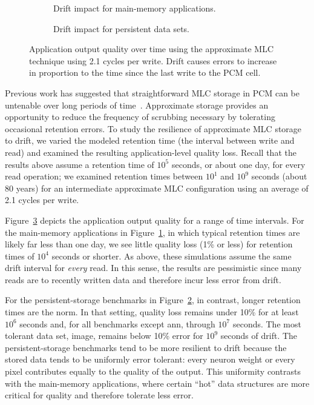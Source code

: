 \begin{figure}
    \begin{subfigure}[b]{0.5\columnwidth}
        \centering
        
        \caption{
            Drift impact for main-memory applications.
        }
        \label{approxstorage:fig:mm-drift}
    \end{subfigure}
    \begin{subfigure}[b]{0.5\columnwidth}
        \centering
        
        \caption{
            Drift impact for persistent data sets.
        }
        \label{approxstorage:fig:nv-drift}
    \end{subfigure}
    \caption{
        Application output quality over time using the approximate MLC
        technique using 2.1 cycles per write.
        Drift causes errors to increase in proportion to the time
        since the last write to the PCM cell.
    }
    \label{approxstorage:fig:drift}
\end{figure}

Previous work has suggested that straightforward MLC storage in PCM can be
untenable over long periods of time~\cite{wdddmlcpcm}.
Approximate storage provides an opportunity to reduce the frequency of
scrubbing necessary by tolerating occasional retention errors.
To study the resilience of approximate MLC storage to drift,
we varied the modeled retention time (the interval between write and read) and
examined the resulting application-level quality loss.
Recall that the results
above assume a retention time of $10^5$ seconds, or about one day, for every
read operation; we examined retention times between $10^1$ and $10^9$ seconds
(about 80 years) for an intermediate approximate MLC configuration using an
average of 2.1 cycles per write.

Figure~\ref{approxstorage:fig:drift} depicts the application output quality for a range of
time intervals.
For the main-memory applications in Figure~\ref{approxstorage:fig:mm-drift}, in which typical retention times are
likely far less than one day, we see little quality loss (1\% or
less) for retention times of $10^4$ seconds or shorter.
As above, these simulations assume the same drift interval for \emph{every}
read.
In this sense, the results are pessimistic since many reads
are to recently written data and therefore incur less error from
drift.

For the
persistent-storage benchmarks in Figure~\ref{approxstorage:fig:nv-drift}, in contrast, longer retention times are the
norm.
In that setting, quality loss remains under 10\% for at least
$10^6$ seconds and, for all benchmarks except \textsf{ann}, through $10^7$ seconds.
The most tolerant data set, \textsf{image}, remains below 10\% error for
$10^9$ seconds of drift.
The persistent-storage benchmarks tend to be more resilient to drift because
the stored data tends to be uniformly error tolerant: every neuron weight or
every pixel contributes equally to the quality of the output.
This uniformity contrasts with the main-memory applications, where certain
``hot'' data structures are more critical for quality and therefore
tolerate less error.

